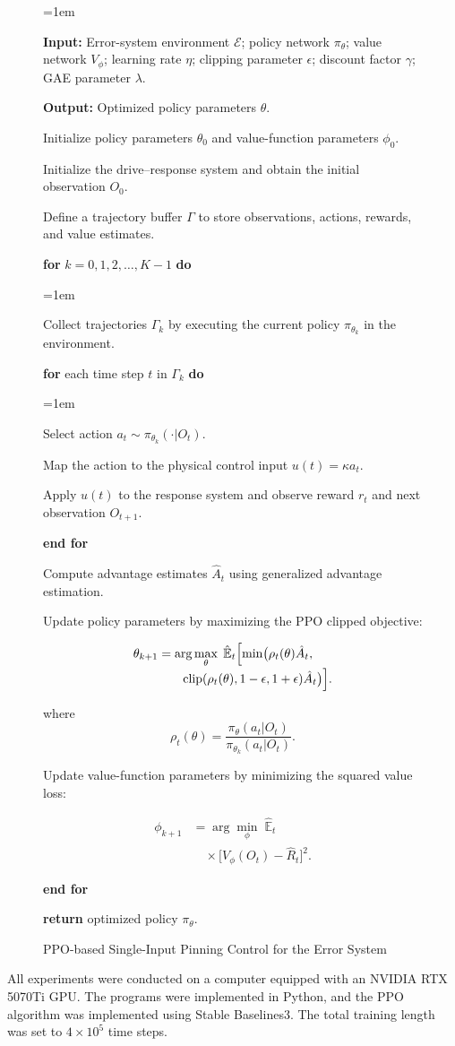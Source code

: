 \documentclass[10pt,twocolumn]{article}
\newenvironment{algorithm}[1][]{\begin{figure}[t]\renewcommand{\figurename}{Algorithm}\small}{\end{figure}}
\newenvironment{algorithmic}[1][]{\begin{list}{}{\leftmargin=1em\itemsep=1pt}\item[]}{\end{list}}
\newcommand{\Require}{\par\noindent\textbf{Input:} }
\newcommand{\Ensure}{\par\noindent\textbf{Output:} }
\newcommand{\State}{\par\noindent}
\newcommand{\Statex}{\par\noindent}
\newcommand{\For}[1]{\par\noindent\textbf{for} #1 \textbf{do}\par\begingroup\leftskip=1em}
\newcommand{\EndFor}{\par\endgroup\noindent\textbf{end for}}
\newcommand{\Return}{\textbf{return} }
\theoremstyle{definition}
\begin{document}
\begin{algorithm}[t]
	\caption{PPO-based Single-Input Pinning Control for the Error System}
	\label{alg:ppo_pinning}
	\begin{algorithmic}[1]
		\Require Error-system environment $\mathcal{E}$; policy network $\pi_{\theta}$; value network $V_{\phi}$; learning rate $\eta$; clipping parameter $\epsilon$; discount factor $\gamma$; GAE parameter $\lambda$.
		\Ensure Optimized policy parameters $\theta$.
		
		\State Initialize policy parameters $\theta_0$ and value-function parameters $\phi_0$.
		\State Initialize the drive--response system and obtain the initial observation $O_0$.
		\State Define a trajectory buffer $\Gamma$ to store observations, actions, rewards, and value estimates.
		
		\For{$k = 0,1,2,\ldots,K-1$}
		\State Collect trajectories $\Gamma_k$ by executing the current policy $\pi_{\theta_k}$ in the environment.
		\For{each time step $t$ in $\Gamma_k$}
		\State Select action $a_t \sim \pi_{\theta_k}(\cdot|O_t)$.
		\State Map the action to the physical control input $u(t)=\kappa a_t$.
		\State Apply $u(t)$ to the response system and observe reward $r_t$ and next observation $O_{t+1}$.
		\EndFor
		
		\State Compute advantage estimates $\hat{A}_t$ using generalized advantage estimation.
		\State Update policy parameters by maximizing the PPO clipped objective:
		\Statex
		\[
\begin{aligned}
\theta_{k+1}
&=\arg\max_{\theta}\;\hat{\mathbb{E}}_t\Bigl[
\min\bigl(\rho_t(\theta)\hat A_t,\\[-1mm]
&\qquad\mathrm{clip}(\rho_t(\theta),1-\epsilon,1+\epsilon)
\hat A_t\bigr)\Bigr].
\end{aligned}
\]
		\Statex
		where
		\[
		\rho_t(\theta)
		=\frac{\pi_{\theta}(a_t|O_t)}
		{\pi_{\theta_k}(a_t|O_t)}.
		\]
		
		\State Update value-function parameters by minimizing the squared value loss:
		\Statex
		\[
\begin{aligned}
\phi_{k+1}
&=\arg\min_{\phi}\;
\hat{\mathbb{E}}_t\\
&\quad\times\bigl[V_{\phi}(O_t)-\hat R_t\bigr]^2.
\end{aligned}
\]
		\EndFor
		
		\State \Return optimized policy $\pi_{\theta}$.
	\end{algorithmic}
\end{algorithm}

All experiments were conducted on a computer equipped with an NVIDIA RTX 5070Ti GPU. The programs were implemented in Python, and the PPO algorithm was implemented using Stable Baselines3. The total training length was set to $4\times 10^5$ time steps.
\end{document}
